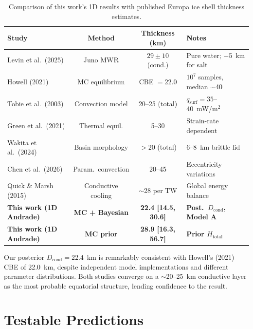 \documentclass[11pt,letterpaper]{article}
\begin{document}
\begin{table}[htbp]
\centering
\caption{Comparison of this work's 1D results with published Europa ice shell thickness estimates.}
\label{tab:lit_comparison}
\small
\begin{tabular}{@{}p{4cm}ccp{5cm}@{}}
\toprule
\textbf{Study} & \textbf{Method} & \textbf{Thickness (km)} & \textbf{Notes} \\
\midrule
Levin et al.\ (2025) & Juno MWR & $29 \pm 10$ (cond.) & Pure water; $-$5~km for salt \\
Howell (2021) & MC equilibrium & CBE $= 22.0$ & $10^7$ samples, median $\sim$40 \\
Tobie et al.\ (2003) & Convection model & 20--25 (total) & $q_\mathrm{surf} = 35$--40~mW/m$^2$ \\
Green et al.\ (2021) & Thermal equil. & 5--30 & Strain-rate dependent \\
Wakita et al.\ (2024) & Basin morphology & $>$20 (total) & 6--8~km brittle lid \\
Chen et al.\ (2026) & Param.\ convection & 20--45 & Eccentricity variations \\
Quick \& Marsh (2015) & Conductive cooling & $\sim$28 per TW & Global energy balance \\
\midrule
\textbf{This work (1D Andrade)} & \textbf{MC + Bayesian} & \textbf{22.4 [14.5, 30.6]} & \textbf{Post.\ $D_\mathrm{cond}$, Model A} \\
\textbf{This work (1D Andrade)} & \textbf{MC prior} & \textbf{28.9 [16.3, 56.7]} & \textbf{Prior $H_\mathrm{total}$} \\
\bottomrule
\end{tabular}
\end{table}

Our posterior $D_\mathrm{cond} = 22.4$~km is remarkably consistent with Howell's (2021) CBE of 22.0~km, despite independent model implementations and different parameter distributions. Both studies converge on a $\sim$20--25~km conductive layer as the most probable equatorial structure, lending confidence to the result.


\section{Testable Predictions}
\label{sec:predictions}
\end{document}
